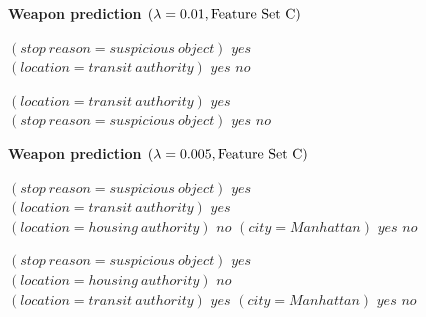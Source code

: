 \begin{figure}[b!]
\textbf{Weapon prediction $({\lambda} = 0.01, \text{Feature Set~C})$}
\vspace{1mm}
\begin{algorithmic}
\State \bif $(stop~reason = suspicious~object)$ \bthen $yes$ 
\State \belif $(location = transit~authority)$ \bthen $yes$
\State \belse $no$
\end{algorithmic}
\vspace{1mm}
\begin{algorithmic}
\State \bif $(location = transit~authority)$ \bthen $yes$ 
\State \belif $(stop~reason = suspicious~object)$ \bthen $yes$
\State \belse $no$
\end{algorithmic}
\vspace{5mm}
\textbf{Weapon prediction $({\lambda} = 0.005, \text{Feature Set~C})$}
\begin{algorithmic}
\State \bif $(stop~reason = suspicious~object)$ \bthen $yes$ 
\State \belif $(location = transit~authority)$ \bthen $yes$
\State \belif $(location = housing~authority)$ \bthen $no$
\State \belif $(city = Manhattan)$ \bthen $yes$
\State \belse $no$
\end{algorithmic}
\vspace{1mm}
\begin{algorithmic}
\State \bif $(stop~reason = suspicious~object)$ \bthen $yes$ 
\State \belif $(location = housing~authority)$ \bthen $no$
\State \belif $(location = transit~authority)$ \bthen $yes$
\State \belif $(city = Manhattan)$ \bthen $yes$
\State \belse $no$
\end{algorithmic}
\vspace{1mm}

\end{figure}
